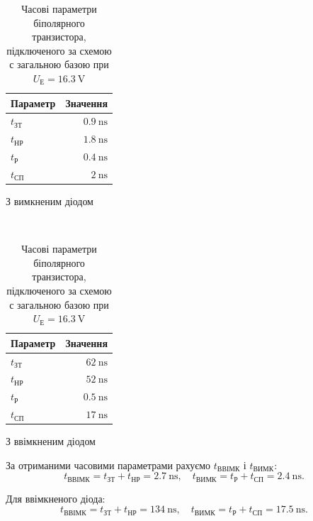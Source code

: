 \documentclass[a4paper,oneside,DIV=10,12pt]{scrartcl}
\begin{document}
		\begin{table}[H]
		\centering
			\begin{subtable}[h]{0.4\textwidth}
			\centering
				\begin{tabular}{lr}
				\toprule
				Параметр & Значення\\
				\midrule
				$t_{\text{ЗТ}}$ & $\SI{0,9}{\nano\second}$\\
				$t_{\text{НР}}$ & $\SI{1,8}{\nano\second}$\\
				$t_{\text{Р}}$ & $\SI{0,4}{\nano\second}$\\
				$t_{\text{СП}}$ & $\SI{2}{\nano\second}$\\
				\bottomrule
				\end{tabular}
				\caption{З вимкненим діодом}
			\end{subtable}
			~
			\begin{subtable}[h]{0.4\textwidth}
			\centering
				\begin{tabular}{lr}
				\toprule
				Параметр & Значення\\
				\midrule
				$t_{\text{ЗТ}}$ & $\SI{62}{\nano\second}$\\
				$t_{\text{НР}}$ & $\SI{52}{\nano\second}$\\
				$t_{\text{Р}}$ & $\SI{0,5}{\nano\second}$\\
				$t_{\text{СП}}$ & $\SI{17}{\nano\second}$\\
				\bottomrule
				\end{tabular}
				\caption{З ввімкненим діодом}
			\end{subtable}
		\caption{Часові параметри біполярного транзистора, підключеного за схемою с загальною базою при $U_{\text{Е}} = \SI{16,3}{\volt}$}
		\end{table}
		
		За отриманими часовими параметрами рахуємо $t_{\text{ВВІМК}}$ і $t_{\text{ВИМК}}$:
		\[
			t_{\text{ВВІМК}} = t_{\text{ЗТ}} + t_{\text{НР}} = \SI{2,7}{\nano\second}, \quad t_{\text{ВИМК}} = t_{\text{Р}} + t_{\text{СП}} = \SI{2,4}{\nano\second}.
		\]
		
		Для ввімкненого діода:
		\[
			t_{\text{ВВІМК}} = t_{\text{ЗТ}} + t_{\text{НР}} = \SI{134}{\nano\second}, \quad t_{\text{ВИМК}} = t_{\text{Р}} + t_{\text{СП}} = \SI{17,5}{\nano\second}.
		\]
		
\end{document}
